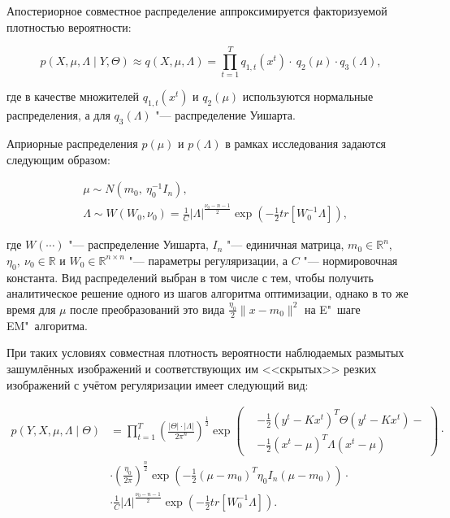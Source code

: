 Апостериорное совместное распределение аппроксимируется факторизуемой плотностью вероятности:

\begin{equation*}
	p\left(X,\mu,\Lambda\middle|Y,\Theta\right)\approx q\left(X,\mu,\Lambda\right)=\prod_{t=1}^{T}{q_{1,t}\left(x^t\right)\cdot\ q_2\left(\mu\right)\cdot q_3\left(\Lambda\right)},
\end{equation*}

\noindent где в качестве множителей $q_{1,t}\left(x^t\right)$ и $q_2\left(\mu\right)$ используются нормальные распределения, а для $q_3\left(\Lambda\right)$ "--- распределение Уишарта.

Априорные распределения $p\left(\mu\right)$ и $p\left(\Lambda\right)$ в рамках исследования задаются следующим образом:

\begin{align*}
	&\mu \sim N\left(m_0,\ \eta_0^{-1}I_n\right), \\
	&\Lambda \sim W\left(W_0,\nu_0\right)=\frac{1}{C}\left|\Lambda\right|^\frac{\nu_0-n-1}{2}\exp{\left(-\frac{1}{2}tr\left[W_0^{-1}\Lambda\right]\right)},
\end{align*}

\noindent где $W(\cdots)$ "--- распределение Уишарта, $I_n$ "--- единичная матрица, $m_0\in\mathbb{R}^n$, $\eta_0,\ \nu_0\in\mathbb{R}$ и $W_0\in\mathbb{R}^{n \times n}$ "--- параметры регуляризации, а $C$ "--- нормировочная константа. Вид распределений выбран в том числе с тем, чтобы получить аналитическое решение одного из шагов алгоритма оптимизации, однако в то же время для $\mu$ после преобразований это  вида $\frac{\eta_0}{2} \lVert x - m_0 \rVert^2$ на E"~шаге EM"~алгоритма.

При таких условиях совместная плотность вероятности наблюдаемых размытых зашумлённых изображений и соответствующих им <<скрытых>> резких изображений с учётом регуляризации имеет следующий вид:

\begin{align*}
	p\left(Y,X,\mu,\Lambda \middle| \Theta\right) &= \prod_{t=1}^{T} \left( \frac{\lvert\Theta\rvert \cdot \lvert\Lambda\rvert}{{2\pi}^{n}} \right)^\frac{1}{2} \exp\left(
	\begin{aligned}
		&-\frac{1}{2}\left(y^t-Kx^t\right)^T\Theta\left(y^t-Kx^t\right) - \\
		&-\frac{1}{2}\left(x^t-\mu\right)^T\Lambda\left(x^t-\mu\right)
	\end{aligned}
	\right) \cdot \\
	&\cdot \left(\frac{\eta_0}{2\pi}\right)^\frac{n}{2} \exp \left(-\frac{1}{2}\left(\mu-m_0\right)^T\eta_0I_n\left(\mu-m_0\right)\right) \cdot \\
	&\cdot \frac{1}{C}\lvert\Lambda\rvert^\frac{\nu_0-n-1}{2}\exp{\left(-\frac{1}{2}tr\left[W_0^{-1}\Lambda\right]\right)}.
\end{align*}

